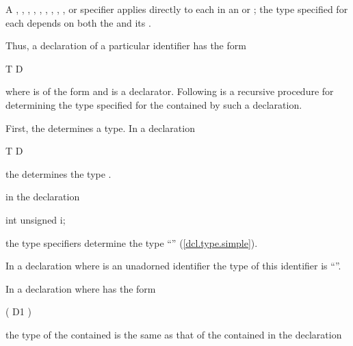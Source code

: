 \pnum
A
,
,
,
,
,
,
,
,
,
or
specifier applies directly to each 
in an  or ;
the type specified for each  depends on
both the  and its .

\pnum
Thus, a declaration of a particular identifier has the form

\begin{codeblock}
T D
\end{codeblock}

where
is of the form 
and
is a declarator.
Following is a recursive procedure for determining
the type specified for the contained
by such a declaration.

\pnum
First, the
determines a type.
In a declaration

\begin{codeblock}
T D
\end{codeblock}

the
determines the type
.
\begin{example}
in the declaration

\begin{codeblock}
int unsigned i;
\end{codeblock}

the type specifiers
determine the type
``''
(\ref{dcl.type.simple}).
\end{example}

\pnum
In a declaration
where
is an unadorned identifier the type of this identifier is
``''.

\pnum
In a declaration
where
has the form

\begin{ncsimplebnf}
( D1 )
\end{ncsimplebnf}

the type of the contained
is the same as that of the contained
in the declaration

